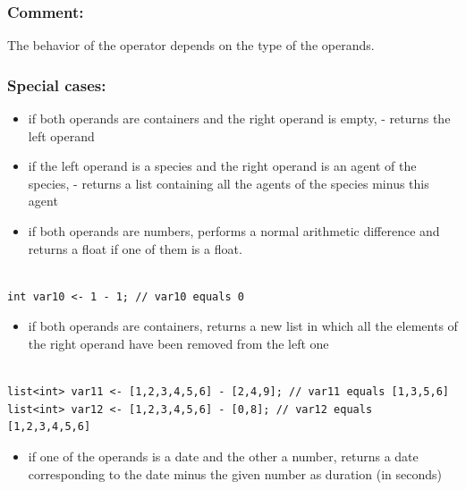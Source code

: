 \documentclass[]{book}
\providecommand{\tightlist}{%
  \setlength{\itemsep}{0pt}\setlength{\parskip}{0pt}}
\theoremstyle{definition}
\theoremstyle{definition}
\theoremstyle{definition}
\theoremstyle{remark}
\begin{document}
\subsubsection{Comment:}\label{comment}

The behavior of the operator depends on the type of the operands.

\subsubsection{Special cases:}\label{special-cases}

\begin{itemize}
\tightlist
\item
  if both operands are containers and the right operand is empty, -
  returns the left operand\\
\item
  if the left operand is a species and the right operand is an agent of
  the species, - returns a list containing all the agents of the species
  minus this agent\\
\item
  if both operands are numbers, performs a normal arithmetic difference
  and returns a float if one of them is a float.
\end{itemize}

\begin{verbatim}
 
int var10 <- 1 - 1; // var10 equals 0
\end{verbatim}

\begin{itemize}
\tightlist
\item
  if both operands are containers, returns a new list in which all the
  elements of the right operand have been removed from the left one
\end{itemize}

\begin{verbatim}
 
list<int> var11 <- [1,2,3,4,5,6] - [2,4,9]; // var11 equals [1,3,5,6] 
list<int> var12 <- [1,2,3,4,5,6] - [0,8]; // var12 equals [1,2,3,4,5,6]
\end{verbatim}

\begin{itemize}
\tightlist
\item
  if one of the operands is a date and the other a number, returns a
  date corresponding to the date minus the given number as duration (in
  seconds)
\end{itemize}
\end{document}
